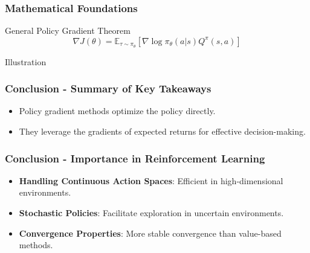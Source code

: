 \documentclass[aspectratio=169]{beamer}
\begin{document}
\begin{frame}[fragile]
  \frametitle{Mathematical Foundations}
  \begin{block}{General Policy Gradient Theorem}
    \begin{equation}
      \nabla J(\theta) = \mathbb{E}_{\tau \sim \pi_\theta} \left[ \nabla \log \pi_\theta(a|s) Q^{\pi}(s, a) \right]
    \end{equation}
  \end{block}

  \begin{block}{Illustration}
  \end{block}
\end{frame}

\begin{frame}[fragile]
    \frametitle{Conclusion - Summary of Key Takeaways}
    
    \begin{itemize}
        \item Policy gradient methods optimize the policy directly.
        \item They leverage the gradients of expected returns for effective decision-making.
    \end{itemize}

\end{frame}

\begin{frame}[fragile]
    \frametitle{Conclusion - Importance in Reinforcement Learning}
    
    \begin{itemize}
        \item \textbf{Handling Continuous Action Spaces}: Efficient in high-dimensional environments.
        \item \textbf{Stochastic Policies}: Facilitate exploration in uncertain environments.
        \item \textbf{Convergence Properties}: More stable convergence than value-based methods.
    \end{itemize}

\end{frame}
\end{document}
